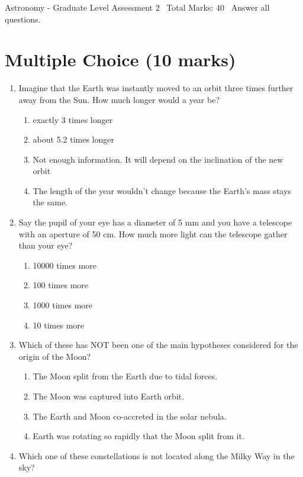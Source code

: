 \documentclass[12pt]{article}
\begin{document}
\begin{center}
Astronomy - Graduate Level Assessment 2 \
Total Marks: 40 \
Answer all questions.
\end{center}

\section*{Multiple Choice (10 marks)}
\begin{enumerate}[label=\arabic*.]
\item Imagine that the Earth was instantly moved to an orbit three times further away from the Sun. How much longer would a year be?
\begin{enumerate}[label=(\alph*)]
    \item exactly 3 times longer
    \item about 5.2 times longer
    \item Not enough information. It will depend on the inclination of the new orbit
    \item The length of the year wouldn't change because the Earth's mass stays the same.
\end{enumerate}
\item Say the pupil of your eye has a diameter of 5 mm and you have a telescope with an aperture of 50 cm. How much more light can the telescope gather than your eye?
\begin{enumerate}[label=(\alph*)]
    \item 10000 times more
    \item 100 times more
    \item 1000 times more
    \item 10 times more
\end{enumerate}
\item Which of these has NOT been one of the main hypotheses considered for the origin of the Moon?
\begin{enumerate}[label=(\alph*)]
    \item The Moon split from the Earth due to tidal forces.
    \item The Moon was captured into Earth orbit.
    \item The Earth and Moon co-accreted in the solar nebula.
    \item Earth was rotating so rapidly that the Moon split from it.
\end{enumerate}
\item Which one of these constellations is not located along the Milky Way in the sky?

\end{enumerate}
\end{document}
